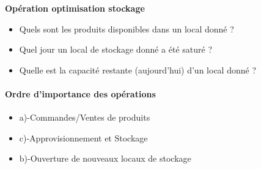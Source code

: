 \textbf{Opération optimisation stockage}
\begin{itemize}
    \item Quels sont les produits disponibles dans un local donné ?
    \item Quel jour un local de stockage donné a été saturé ? \item Quelle est la capacité restante (aujourd’hui) d’un local donné ?
\end{itemize}

\paragraph {Ordre d'importance des opérations} 

\begin{itemize}
    \item a)-Commandes/Ventes de produits
    \item c)-Approvisionnement et Stockage
    \item b)-Ouverture de nouveaux locaux de stockage
\end{itemize}



